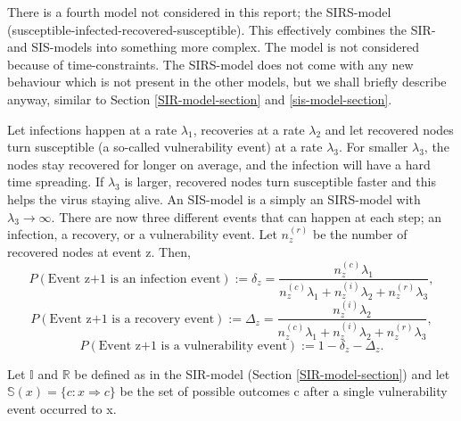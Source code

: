 \documentclass[12pt]{article} %
\numberwithin{equation}{section}
\begin{document}
There is a fourth model not considered in this report; the SIRS-model (susceptible-infected-recovered-susceptible). This effectively combines the SIR- and SIS-models into something more complex. The model is not considered because of time-constraints. The SIRS-model does not come with any new behaviour which is not present in the other models, but we shall briefly describe anyway, similar to Section \ref{SIR-model-section} and \ref{sis-model-section}. 

Let infections happen at a rate $\lambda_1$, recoveries at a rate $\lambda_2$ and let recovered nodes turn susceptible (a so-called vulnerability event) at a rate $\lambda_3$. For smaller $\lambda_3$, the nodes stay recovered for longer on average, and the infection will have a hard time spreading. If $\lambda_3$ is larger, recovered nodes turn susceptible faster and this helps the virus staying alive. An SIS-model is a simply an SIRS-model with $\lambda_3 \rightarrow \infty$. There are now three different events that can happen at each step; an infection, a recovery, or a vulnerability event. Let $n_z^{(r)}$ be the number of recovered nodes at event z. Then,
\begin{equation}\label{SIRS-P1}
    P(\text{Event z+1 is an infection event}) := \delta_z = \frac{n^{(c)}_z\lambda_1}{n^{(c)}_z\lambda_1+n^{(i)}_z\lambda_2+n_z^{(r)}\lambda_3},
\end{equation}
\begin{equation}\label{SIRS-P2}
    P(\text{Event z+1 is a recovery event}) := \Delta_z = \frac{n^{(i)}_z\lambda_2}{n^{(c)}_z\lambda_1+n^{(i)}_z\lambda_2+n_z^{(r)}\lambda_3},
\end{equation}
\begin{equation}\label{SIRS-P3}
    P(\text{Event z+1 is a vulnerability event}) := 1-\delta_z-\Delta_z.
\end{equation}

Let $\mathbb{I}$ and $\mathbb{R}$ be defined as in the SIR-model (Section \ref{SIR-model-section}) and let $\mathbb{S}(x)=\{c: x \Rightarrow c\}$ be the set of possible outcomes c after a single vulnerability event occurred to x.
\end{document}
